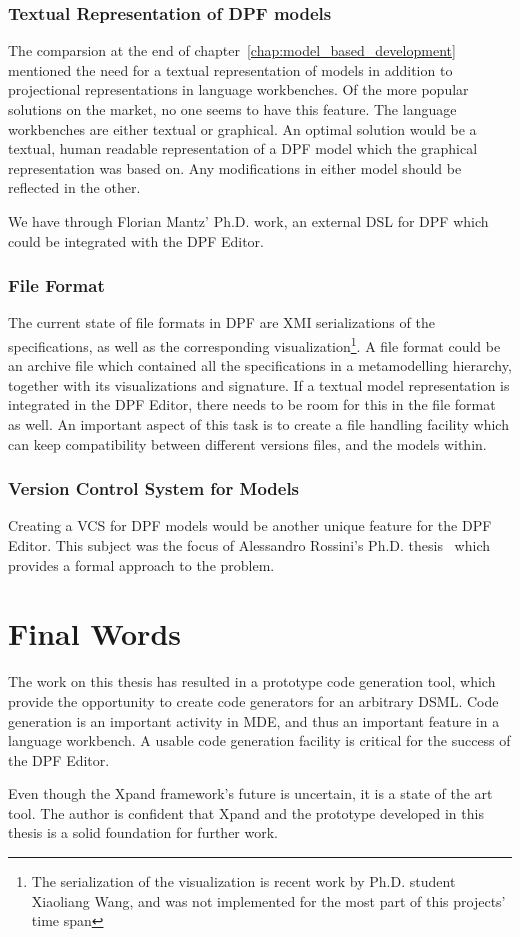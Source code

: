 \subsubsection{Textual Representation of DPF models}
The comparsion at the end of chapter~\ref{chap:model_based_development} mentioned the need for a textual representation of models in addition to projectional representations in language workbenches. Of the more popular solutions on the market, no one seems to have this feature. The language workbenches are either textual or graphical. An optimal solution would be a textual, human readable representation of a DPF model which the graphical representation was based on. Any modifications in either model should be reflected in the other.

We have through Florian Mantz' Ph.D. work, an external DSL for DPF which could be integrated with the DPF Editor.

\subsubsection{File Format}
The current state of file formats in DPF are XMI serializations of the specifications, as well as the corresponding visualization\footnote{The serialization of the visualization is recent work by Ph.D. student Xiaoliang Wang, and was not implemented for the most part of this projects' time span}. A file format could be an archive file which contained all the specifications in a metamodelling hierarchy, together with its visualizations and signature.  If a textual model representation is integrated in the DPF Editor, there needs to be room for this in the file format as well. An important aspect of this task is to create a file handling facility which can keep compatibility between different versions files, and the models within.

\subsubsection{Version Control System for Models}
Creating a VCS for DPF models would be another unique feature for the DPF Editor. This subject was the focus of Alessandro Rossini's Ph.D. thesis~\cite{rossini_thesis_2011} which provides a formal approach to the problem.

\section{Final Words}
The work on this thesis has resulted in a prototype code generation tool, which provide the opportunity to create code generators for an arbitrary DSML. Code generation is an important activity in MDE, and thus an important feature in a language workbench. A usable code generation facility is critical for the success of the DPF Editor.

Even though the Xpand framework's future is uncertain, it is a state of the art tool. The author is confident that Xpand and the prototype developed in this thesis is a solid foundation for further work.














